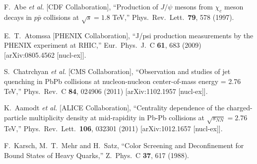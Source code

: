 \documentclass[aps,prc,preprint,superscriptaddress,showpacs,showkeys]{revtex4-1}
\begin{document}
\begin{thebibliography}{100}
  F.~Abe {\it et al.}  [CDF Collaboration],
  ``Production of $J/\psi$ mesons from $\chi_c$ meson decays in $p\bar{p}$ collisions at $\sqrt{s} = 1.8$ TeV,''
  Phys.\ Rev.\ Lett.\  {\bf 79}, 578 (1997).


  E.~T.~Atomssa [PHENIX Collaboration],
  ``J/psi production measurements by the PHENIX experiment at RHIC,''
  Eur.\ Phys.\ J.\ C {\bf 61}, 683 (2009)
  [arXiv:0805.4562 [nucl-ex]].

  S.~Chatrchyan {\it et al.}  [CMS Collaboration],
  ``Observation and studies of jet quenching in PbPb collisions at nucleon-nucleon center-of-mass energy = 2.76 TeV,''
  Phys.\ Rev.\ C {\bf 84}, 024906 (2011)
  [arXiv:1102.1957 [nucl-ex]].




  K.~Aamodt {\it et al.}  [ALICE Collaboration],
  ``Centrality dependence of the charged-particle multiplicity density at mid-rapidity in Pb-Pb collisions at $\sqrt{s_{NN}}=2.76$ TeV,''
  Phys.\ Rev.\ Lett.\  {\bf 106}, 032301 (2011)
  [arXiv:1012.1657 [nucl-ex]].


  F.~Karsch, M.~T.~Mehr and H.~Satz,
  ``Color Screening and Deconfinement for Bound States of Heavy Quarks,''
  Z.\ Phys.\ C {\bf 37}, 617 (1988).



\end{thebibliography}
\end{document}
